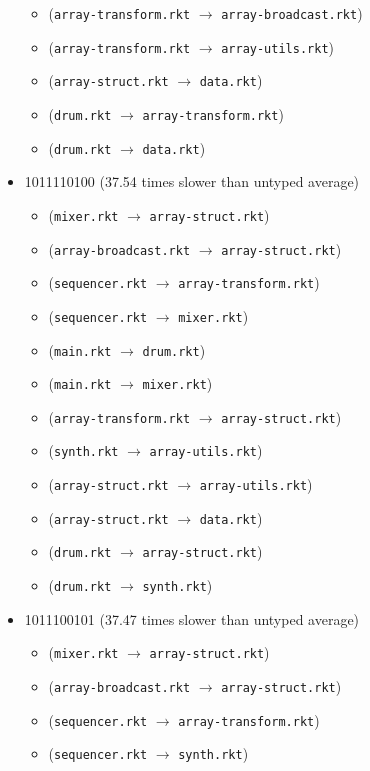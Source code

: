 \documentclass{article}
\newcommand{\mono}[1]{\texttt{#1}}
\begin{document}
\begin{itemize}
\begin{itemize}
  \item (\mono{array-transform.rkt} $\rightarrow$ \mono{array-broadcast.rkt})
  \item (\mono{array-transform.rkt} $\rightarrow$ \mono{array-utils.rkt})
  \item (\mono{array-struct.rkt} $\rightarrow$ \mono{data.rkt})
  \item (\mono{drum.rkt} $\rightarrow$ \mono{array-transform.rkt})
  \item (\mono{drum.rkt} $\rightarrow$ \mono{data.rkt})
  \end{itemize}
\item 1011110100 (37.54 times slower than untyped average)
  \begin{itemize}
  \item (\mono{mixer.rkt} $\rightarrow$ \mono{array-struct.rkt})
  \item (\mono{array-broadcast.rkt} $\rightarrow$ \mono{array-struct.rkt})
  \item (\mono{sequencer.rkt} $\rightarrow$ \mono{array-transform.rkt})
  \item (\mono{sequencer.rkt} $\rightarrow$ \mono{mixer.rkt})
  \item (\mono{main.rkt} $\rightarrow$ \mono{drum.rkt})
  \item (\mono{main.rkt} $\rightarrow$ \mono{mixer.rkt})
  \item (\mono{array-transform.rkt} $\rightarrow$ \mono{array-struct.rkt})
  \item (\mono{synth.rkt} $\rightarrow$ \mono{array-utils.rkt})
  \item (\mono{array-struct.rkt} $\rightarrow$ \mono{array-utils.rkt})
  \item (\mono{array-struct.rkt} $\rightarrow$ \mono{data.rkt})
  \item (\mono{drum.rkt} $\rightarrow$ \mono{array-struct.rkt})
  \item (\mono{drum.rkt} $\rightarrow$ \mono{synth.rkt})
  \end{itemize}
\item 1011100101 (37.47 times slower than untyped average)
  \begin{itemize}
  \item (\mono{mixer.rkt} $\rightarrow$ \mono{array-struct.rkt})
  \item (\mono{array-broadcast.rkt} $\rightarrow$ \mono{array-struct.rkt})
  \item (\mono{sequencer.rkt} $\rightarrow$ \mono{array-transform.rkt})
  \item (\mono{sequencer.rkt} $\rightarrow$ \mono{synth.rkt})

\end{itemize}
\end{itemize}
\end{document}
